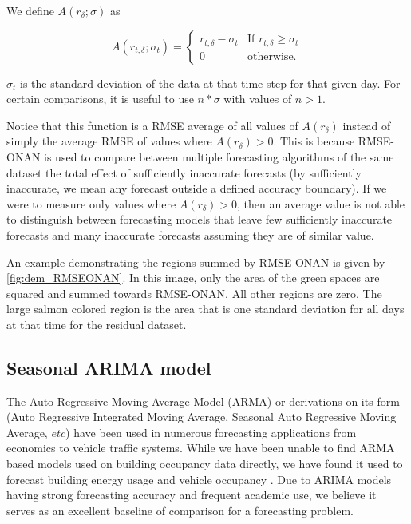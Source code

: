 We define $A(r_{\delta}; \sigma)$ as

\begin{equation}
A(r_{t, \delta}; \sigma_{t}) = \begin{cases}
			r_{t, \delta} - \sigma_{t}   &    \text{If }r_{t, \delta} \ge \sigma_{t} \\
			0                     &    \text{otherwise.}
			\end{cases}
\end{equation}

$\sigma_{t}$ is the standard deviation of the data at that time step for that given day.  For certain comparisons, it is useful to use $n*\sigma$ with values of $n > 1$.  

Notice that this function is a RMSE average of all values of $A(r_{\delta})$ instead of simply the average RMSE of values where $A(r_{\delta}) > 0$.  This is because RMSE-ONAN is used to compare between multiple forecasting algorithms of the same dataset the total effect of sufficiently inaccurate forecasts (by sufficiently inaccurate, we mean any forecast outside a defined accuracy boundary).  If we were to measure only values where $A(r_{\delta}) > 0$, then an average value is not able to distinguish between forecasting models that leave few sufficiently inaccurate forecasts and many inaccurate forecasts assuming they are of similar value.

An example demonstrating the regions summed by RMSE-ONAN is given by \ref{fig:dem_RMSEONAN}.  In this image, only the area of the green spaces are squared and summed towards RMSE-ONAN.  All other regions are zero.  The large salmon colored region is the area that is one standard deviation for all days at that time for the residual dataset.

\subsection{Seasonal ARIMA model}
The Auto Regressive Moving Average Model (ARMA) or derivations on its form (Auto Regressive Integrated Moving Average, Seasonal Auto Regressive Moving Average, $etc$) have been used in numerous forecasting applications from economics to vehicle traffic systems.  While we have been unable to find ARMA based models used on building occupancy data directly, we have found it used to forecast building energy usage and vehicle occupancy \cite{Williams2003, Hong2011, Newsham2010, Howard2013, Fernandez2011}.  Due to ARIMA models having strong forecasting accuracy and frequent academic use, we believe it serves as an excellent baseline of comparison for a forecasting problem.  

